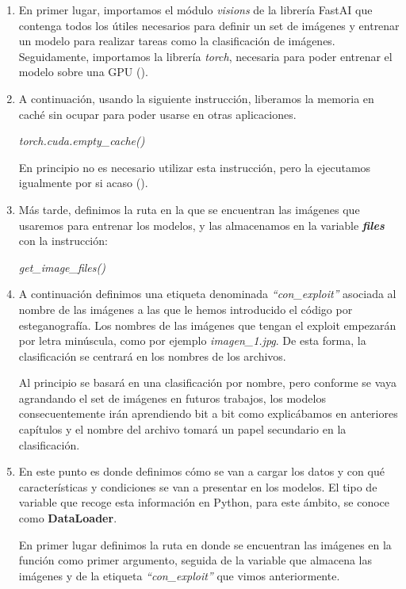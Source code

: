 \begin{enumerate}
\item En primer lugar, importamos el módulo \textit{visions} de la librería FastAI que contenga todos los útiles necesarios para definir un set de imágenes y entrenar un modelo para realizar tareas como la clasificación de imágenes. Seguidamente, importamos la librería \textit{torch}, necesaria para poder entrenar el modelo sobre una \ac{GPU} (\cite{pytorch}). %
\item A continuación, usando la siguiente instrucción, liberamos la memoria en caché sin ocupar para poder usarse en otras aplicaciones.

\begin{center}
\textit{torch.cuda.empty\_cache()}
\end{center}

En principio no es necesario utilizar esta instrucción, pero la ejecutamos igualmente por si acaso (\cite{cuda-empty-cache}).
\item Más tarde, definimos la ruta en la que se encuentran las imágenes que usaremos para entrenar los modelos, y las almacenamos en la variable \textbf{\textit{files}} con la instrucción:

\begin{center}
\textit{get\_image\_files()}
\end{center}

\item A continuación definimos una etiqueta denominada \textit{``con\_exploit''} asociada al nombre de las imágenes a las que le hemos introducido el código por esteganografía. Los nombres de las imágenes que tengan el exploit empezarán por letra minúscula, como por ejemplo \textit{imagen\_1.jpg}. De esta forma, la clasificación se centrará en los nombres de los archivos.

Al principio se basará en una clasificación por nombre, pero conforme se vaya agrandando el set de imágenes en futuros trabajos, los modelos consecuentemente irán aprendiendo bit a bit como explicábamos en anteriores capítulos y el nombre del archivo tomará un papel secundario en la clasificación.

\item En este punto es donde definimos cómo se van a cargar los datos y con qué características y condiciones se van a presentar en los modelos. El tipo de variable que recoge esta información en Python, para este ámbito, se conoce como \textbf{DataLoader}.

En primer lugar definimos la ruta en donde se encuentran las imágenes en la función como primer argumento, seguida de la variable que almacena las imágenes y de la etiqueta \textit{``con\_exploit''} que vimos anteriormente.


\end{enumerate}
